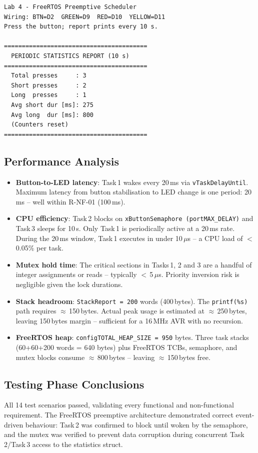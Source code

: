 \documentclass[12pt]{article}
\begin{document}
\begin{verbatim}
Lab 4 - FreeRTOS Preemptive Scheduler
Wiring: BTN=D2  GREEN=D9  RED=D10  YELLOW=D11
Press the button; report prints every 10 s.

========================================
  PERIODIC STATISTICS REPORT (10 s)
========================================
  Total presses     : 3
  Short presses     : 2
  Long  presses     : 1
  Avg short dur [ms]: 275
  Avg long  dur [ms]: 800
  (Counters reset)
========================================
\end{verbatim}

\subsection{Performance Analysis}

\begin{itemize}
    \item \textbf{Button-to-LED latency}: Task\,1 wakes every 20\,ms via \texttt{vTaskDelayUntil}. Maximum latency from button stabilisation to LED change is one period: 20\,ms -- well within R-NF-01 (100\,ms).
    \item \textbf{CPU efficiency}: Task\,2 blocks on \texttt{xButtonSemaphore (portMAX\_DELAY)} and Task\,3 sleeps for 10\,s. Only Task\,1 is periodically active at a 20\,ms rate. During the 20\,ms window, Task\,1 executes in under 10\,$\mu$s -- a CPU load of $<$\,0.05\% per task.
    \item \textbf{Mutex hold time}: The critical sections in Tasks\,1, 2 and 3 are a handful of integer assignments or reads -- typically $<$\,5\,$\mu$s. Priority inversion risk is negligible given the lock durations.
    \item \textbf{Stack headroom}: \texttt{StackReport = 200} words (400\,bytes). The \texttt{printf(\%s)} path requires $\approx$\,150\,bytes. Actual peak usage is estimated at $\approx$\,250\,bytes, leaving 150\,bytes margin -- sufficient for a 16\,MHz AVR with no recursion.
    \item \textbf{FreeRTOS heap}: \texttt{configTOTAL\_HEAP\_SIZE = 950} bytes. Three task stacks (60+60+200 words = 640 bytes) plus FreeRTOS TCBs, semaphore, and mutex blocks consume $\approx$\,800\,bytes -- leaving $\approx$\,150\,bytes free.
\end{itemize}

\subsection{Testing Phase Conclusions}
\hspace{0.8cm} All 14 test scenarios passed, validating every functional and non-functional requirement. The FreeRTOS preemptive architecture demonstrated correct event-driven behaviour: Task\,2 was confirmed to block until woken by the semaphore, and the mutex was verified to prevent data corruption during concurrent Task\,2/Task\,3 access to the statistics struct.
\end{document}
